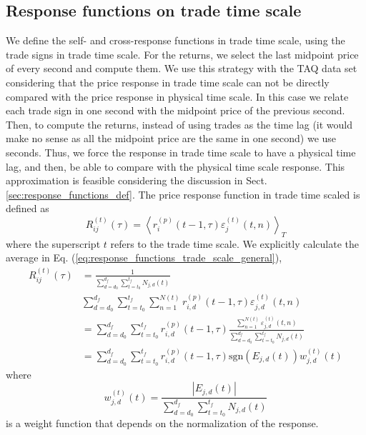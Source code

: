 \subsection{Response functions on trade time scale}
\label{subsec:response_function_trade}

We define the self- and cross-response functions in trade time scale, using the
trade signs in trade time scale. For the returns, we select the last midpoint
price of every second and compute them. We use this strategy with the TAQ data
set considering that the price response in trade time scale can not be directly
compared with the price response in physical time scale. In this case we relate
each trade sign in one second with the midpoint price of the previous second.
Then, to compute the returns, instead of using trades as the time lag (it would
make no sense as all the midpoint price are the same in one second) we use
seconds. Thus, we force the response in trade time scale to have a physical
time lag, and then, be able to compare with the physical time scale response.
This approximation is feasible considering the discussion in Sect.
\ref{sec:response_functions_def}. The price response function in trade time
scaled is defined as
\begin{equation}\label{eq:response_functions_trade_scale_general}
    R^{\left(t\right)}_{ij}\left(\tau\right)=\left\langle r^{\left(p\right)}
    _{i}\left(t-1,\tau \right)\varepsilon_{j}^{\left(t\right)}
    \left(t, n\right)\right\rangle _{T}
\end{equation}
where the superscript $t$ refers to the trade time scale. We explicitly
calculate the average in Eq. (\ref{eq:response_functions_trade_scale_general}),
\begin{align}\label{eq:response_trades_explicit}
    R_{ij}^{\left(t\right)}\left(\tau\right)&=\frac{1}{\sum_{d=d_{0}}^{d_{f}}
    \sum_{t=t_{0}}^{t_{f}}N_{j,d} \left(t \right)} \nonumber \\
    &\sum_{d=d_{0}}^{d_{f}}\sum_{t=t_{0}}^{t_{f}}\sum_{n=1}
    ^{N\left(t\right)} r^{\left(p\right)}_{i,d}\left(t-1, \tau\right)
    \varepsilon_{j,d}^{\left(t\right)}\left(t,n\right)\\
    &=\sum_{d=d_{0}}^{d_{f}}\sum_{t=t_{0}}^{t_{f}} r^{\left(p\right)}_{i,d}
    \left(t-1,\tau\right) \frac{\sum_{n=1}^{N\left(t\right)}
    \varepsilon_{j,d}^{\left(t\right)}\left(t,n \right)}
    {\sum_{d=d_{0}}^{d_{f}} \sum_{t=t_{0}}^{t_{f}}N_{j,d}\left(t\right)}
    \nonumber \\
    &=\sum_{d=d_{0}}^{d_{f}}\sum_{t=t_{0}}^{t_{f}}r^{\left(p\right)}_{i,d}
    \left(t-1,\tau\right) \text{sgn}\left(E_{j,d}\left(t\right)\right)
    w_{j,d}^{\left(t\right)}\left(t\right)
\end{align}
where
\begin{equation}\label{eq:trade_weight}
    w_{j,d}^{\left(t\right)}\left(t\right) =
    \frac{\left|E_{j,d}\left(t\right)\right|}{\sum_{d=d_{0}}^{d_{f}}
    \sum_{t=t_{0}}^{t_{f}}N_{j,d} \left(t\right)}
\end{equation}
is a weight function that depends on the normalization of the response.

